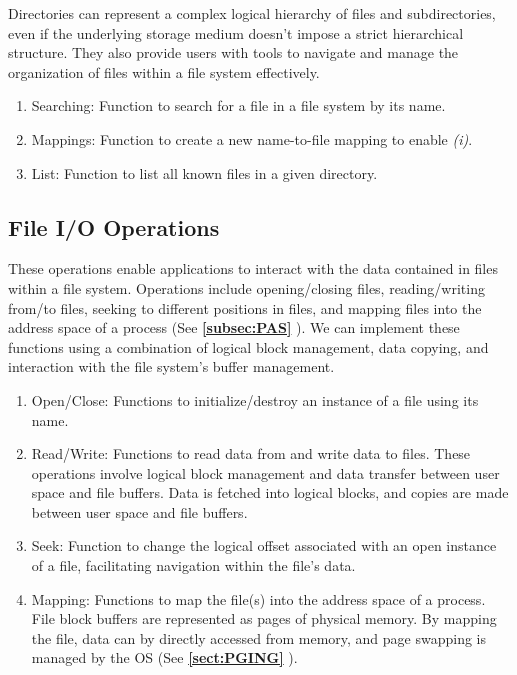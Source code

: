 \documentclass{report}
\newcommand{\refto}[2]{\textbf{\ref{#1:#2} \nameref{#1:#2}}}
\begin{document}
Directories can represent a complex logical hierarchy of files and subdirectories, even if the
underlying storage medium doesn't impose a strict hierarchical structure. They also provide users
with tools to navigate and manage the organization of files within a file system effectively.

\begin{enumerate}[label=\textit{(\roman*)}]
\item Searching: Function to search for a file in a file system by its name.
\item Mappings: Function to create a new name-to-file mapping to enable \textit{(i)}.
\item List: Function to list all known files in a given directory.
\end{enumerate}


\subsection{File I/O Operations}
These operations enable applications to interact with the data contained in files within a file
system. Operations include opening/closing files, reading/writing from/to files, seeking to
different positions in files, and mapping files into the address space of a process (See
\refto{subsec}{PAS}). We can implement these functions using a combination of logical block
management, data copying, and interaction with the file system's buffer management.

\begin{enumerate}[label=\textit{(\roman*)}]
\item Open/Close: Functions to initialize/destroy an instance of a file using its name.
\item Read/Write: Functions to read data from and write data to files. These operations involve
  logical block management and data transfer between user space and file buffers. Data is fetched
  into logical blocks, and copies are made between user space and file buffers.
\item Seek: Function to change the logical offset associated with an open instance of a file,
  facilitating navigation within the file's data.
\item Mapping: Functions to map the file(s) into the address space of a process. File block buffers
  are represented as pages of physical memory. By mapping the file, data can by directly accessed
  from memory, and page swapping is managed by the OS (See \refto{sect}{PGING}).
\end{enumerate}
\end{document}
